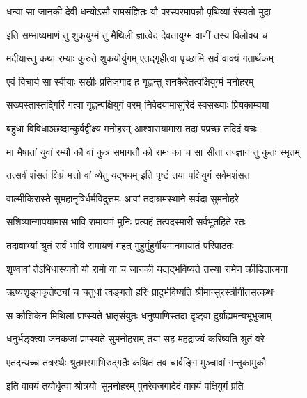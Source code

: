 \twolineshloka
{धन्या सा जानकी देवी धन्योऽसौ रामसंज्ञितः}
{यौ परस्परमापन्नौ पृथिव्यां रंस्यतो मुदा}%

\twolineshloka
{इति सम्भाष्यमाणं तु शुकयुग्मं तु मैथिली}
{ज्ञात्वेदं देवतायुग्मं वाणीं तस्य विलोक्य च}%

\twolineshloka
{मदीयास्तु कथा रम्याः कुरुते शुकयोर्युगम्}
{एतद्गृहीत्वा पृच्छामि सर्वं वाक्यं गतार्थकम्}%

\twolineshloka
{एवं विचार्य सा स्वीयाः सखीः प्रतिजगाद ह}
{गृह्णन्तु शनकैरेतत्पक्षियुग्मं मनोहरम्}%

\twolineshloka
{सख्यस्तास्तद्गिरिं गत्वा गृह्णन्पक्षियुगं वरम्}
{निवेदयामासुरिदं स्वसख्याः प्रियकाम्यया}%

\twolineshloka
{बहुधा विविधाञ्छब्दान्कुर्वद्वीक्ष्य मनोहरम्}
{आश्वासयामास तदा पप्रच्छ तदिदं वचः}%


\twolineshloka
{मा भैषातां युवां रम्यौ कौ वां कुत्र समागतौ}
{को रामः का च सा सीता तज्ज्ञानं तु कुतः स्मृतम्}%

\twolineshloka
{तत्सर्वं शंसतं क्षिप्रं मत्तो वां व्येतु यद्भयम्}
{इति पृष्टं तया पक्षियुगं सर्वमशंसत}%


\twolineshloka
{वाल्मीकिरास्ते सुमहानृषिर्धर्मविदुत्तमः}
{आवां तदाश्रमस्थाने सर्वदा सुमनोहरे}%

\twolineshloka
{सशिष्यान्गापयामास भावि रामायणं मुनिः}
{प्रत्यहं तत्पदस्मारी सर्वभूतहिते रतः}%

\twolineshloka
{तदावाभ्यां श्रुतं सर्वं भावि रामायणं महत्}
{मुहुर्मुहुर्गीयमानमायातं परिपाठतः}%

\twolineshloka
{शृण्वावां तेऽभिधास्यावो यो रामो या च जानकी}
{यद्यद्भविष्यते तस्या रामेण क्रीडितात्मना}%

\twolineshloka
{ऋष्यशृङ्गकृतेष्ट्यां च चतुर्धा त्वङ्गतो हरिः}
{प्रादुर्भविष्यति श्रीमान्सुरस्त्रीगीतसत्कथः}%

\twolineshloka
{स कौशिकेन मिथिलां प्राप्स्यते भ्रातृसंयुतः}
{धनुष्पाणिस्तदा दृष्ट्वा दुर्ग्राह्यमन्यभूभुजाम्}%

\twolineshloka
{धनुर्भङ्क्त्वा जनकजां प्राप्स्यते सुमनोहराम्}
{तया सह महद्राज्यं करिष्यति श्रुतं वरे}%

\twolineshloka
{एतदन्यच्च तत्रस्थैः श्रुतमस्माभिरुद्गतैः}
{कथितं तव चार्वङ्गि मुञ्चावां गन्तुकामुकौ}%

\twolineshloka
{इति वाक्यं तयोर्धृत्वा श्रोत्रयोः सुमनोहरम्}
{पुनरेवजगादेदं वाक्यं पक्षियुगं प्रति}%

